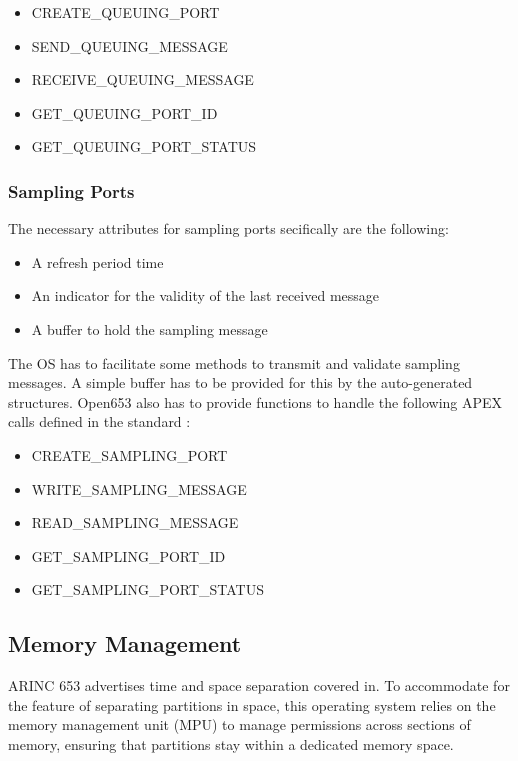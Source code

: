 \begin{itemize}
	\item CREATE\_QUEUING\_PORT
	\item SEND\_QUEUING\_MESSAGE
	\item RECEIVE\_QUEUING\_MESSAGE
	\item GET\_QUEUING\_PORT\_ID
	\item GET\_QUEUING\_PORT\_STATUS
\end{itemize}

\subsubsection{Sampling Ports}
\label{sssec:sampling_ports}
The necessary attributes for sampling ports secifically are the following:
\begin{itemize}
	\item A refresh period time
	\item An indicator for the validity of the last received message
	\item A buffer to hold the sampling message
\end{itemize}

The OS has to facilitate some methods to transmit and validate sampling messages.
A simple buffer has to be provided for this by the auto-generated structures.
Open653 also has to provide functions to handle the following APEX calls defined in the standard \cite{arinc_interpartition_comm}:

\begin{itemize}
	\item CREATE\_SAMPLING\_PORT
	\item WRITE\_SAMPLING\_MESSAGE
	\item READ\_SAMPLING\_MESSAGE
	\item GET\_SAMPLING\_PORT\_ID
	\item GET\_SAMPLING\_PORT\_STATUS
\end{itemize}


\subsection{Memory Management}
ARINC 653 advertises time and space separation covered in.
To accommodate for the feature of separating partitions in space,
this operating system relies on the memory management unit (MPU)
to manage permissions across sections of memory,
ensuring that partitions stay within a dedicated memory space.

